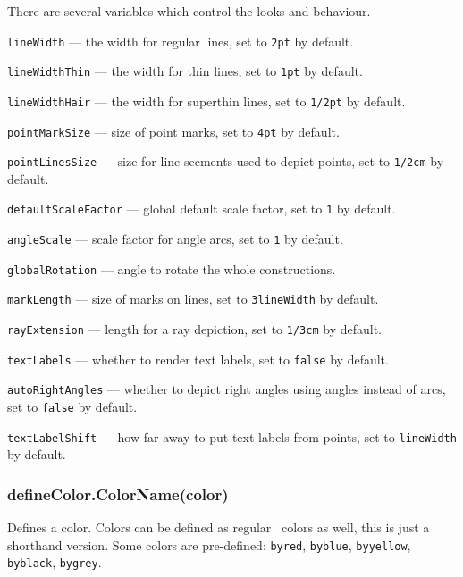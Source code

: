 \documentclass{ltxdoc}
\begin{document}
	There are several variables which control the looks and behaviour.
	
	\texttt{lineWidth} — the width for regular lines, set to \texttt{2pt} by default.
	
	\texttt{lineWidthThin} — the width for thin lines, set to \texttt{1pt} by default.
	
	\texttt{lineWidthHair} — the width for superthin lines, set to \texttt{1/2pt} by default.
	
	\texttt{pointMarkSize} — size of point marks, set to \texttt{4pt} by default.
	
	\texttt{pointLinesSize} — size for line secments used to depict points, set to \texttt{1/2cm} by default.

	\texttt{defaultScaleFactor} — global default scale factor, set to \texttt{1} by default.
	
	\texttt{angleScale} — scale factor for angle arcs, set to \texttt{1} by default.

	\texttt{globalRotation} — angle to rotate the whole constructions.

	\texttt{markLength} — size of marks on lines, set to \texttt{3lineWidth} by default.

	\texttt{rayExtension} — length for a ray depiction, set to \texttt{1/3cm} by default.

	
	\texttt{textLabels} — whether to render text labels, set to \texttt{false} by default.


	\texttt{autoRightAngles} — whether to depict right angles using angles instead of arcs, set to \texttt{false} by default.

	
	\texttt{textLabelShift} — how far away to put text labels from points, set to \texttt{lineWidth} by default.
	


\subsubsection{defineColor.ColorName(color)}\label{defineColor}
	
	Defines a color. Colors can be defined as regular \METAPOST\ colors as well, this is just a shorthand version. Some colors are pre-defined: \texttt{byred}, \texttt{byblue}, \texttt{byyellow}, \texttt{byblack}, \texttt{bygrey}.
\end{document}
